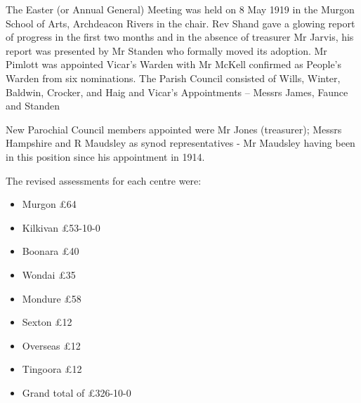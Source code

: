 The Easter (or Annual General) Meeting was held on 8 May 1919 in the Murgon School of Arts, Archdeacon Rivers in the chair. Rev Shand gave a glowing report of progress in the first two months and in the absence of treasurer Mr Jarvis, his report was presented by Mr Standen who formally moved its adoption. Mr Pimlott was appointed Vicar's Warden with Mr McKell confirmed as People's Warden from six nominations. The Parish Council consisted of Wills, Winter, Baldwin, Crocker, and Haig and Vicar's Appointments -- Messrs James, Faunce and Standen



New Parochial Council members appointed were Mr Jones (treasurer); Messrs Hampshire and R Maudsley as synod representatives - Mr Maudsley having been in this position since his appointment in 1914.



The revised assessments for each centre were:



\begin{itemize}

\item

  Murgon \pounds64

\item

  Kilkivan \pounds53-10-0

\item

  Boonara \pounds40

\item

  Wondai \pounds35

\item

  Mondure \pounds58

\item

  Sexton \pounds12

\item

  Overseas \pounds12

\item

  Tingoora \pounds12

\item

  Grand total of \pounds326-10-0

\end{itemize}



